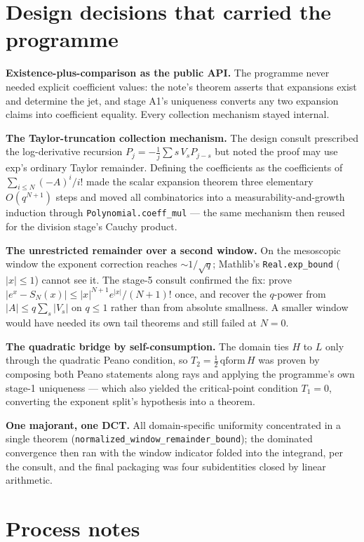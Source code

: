 \documentclass[11pt]{article}
\newcommand{\code}[1]{\texttt{#1}}
\begin{document}
\section{Design decisions that carried the programme}

\textbf{Existence-plus-comparison as the public API.} The programme
never needed explicit coefficient values: the note's theorem asserts
that expansions exist and determine the jet, and stage A1's
uniqueness converts any two expansion claims into coefficient
equality. Every collection mechanism stayed internal.

\textbf{The Taylor-truncation collection mechanism.} The design
consult prescribed the log-derivative recursion
$P_j = -\tfrac1j\sum s\,V_s P_{j-s}$ but noted the proof may use
exp's ordinary Taylor remainder. Defining the coefficients as the
coefficients of $\sum_{i\le N} (-A)^i/i!$ made the scalar expansion
theorem three elementary $O(q^{N+1})$ steps and moved all
combinatorics into a measurability-and-growth induction through
\code{Polynomial.coeff\_mul} --- the same mechanism then reused for
the division stage's Cauchy product.

\textbf{The unrestricted remainder over a second window.} On the
mesoscopic window the exponent correction reaches $\sim 1/\sqrt q$;
Mathlib's \code{Real.exp\_bound} ($|x| \le 1$) cannot see it. The
stage-5 consult confirmed the fix: prove
$|e^x - S_N(x)| \le |x|^{N+1}e^{|x|}/(N{+}1)!$ once, and recover the
$q$-power from $|A| \le q\sum_s|V_s|$ on $q \le 1$ rather than from
absolute smallness. A smaller window would have needed its own tail
theorems and still failed at $N = 0$.

\textbf{The quadratic bridge by self-consumption.} The domain ties
$H$ to $L$ only through the quadratic Peano condition, so
$T_2 = \tfrac12\,\mathrm{qform}\,H$ was proven by composing both
Peano statements along rays and applying the programme's own stage-1
uniqueness --- which also yielded the critical-point condition
$T_1 = 0$, converting the exponent split's hypothesis into a theorem.

\textbf{One majorant, one DCT.} All domain-specific uniformity
concentrated in a single theorem
(\code{normalized\_window\_remainder\_bound}); the dominated
convergence then ran with the window indicator folded into the
integrand, per the consult, and the final packaging was four
subidentities closed by linear arithmetic.

\section{Process notes}
\end{document}
